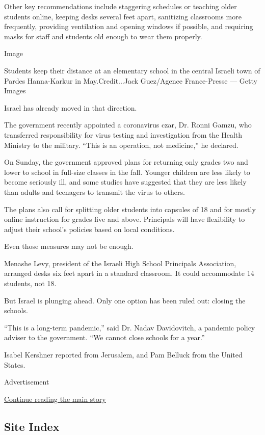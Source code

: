 Other key recommendations include staggering schedules or teaching older
students online, keeping desks several feet apart, sanitizing classrooms
more frequently, providing ventilation and opening windows if possible,
and requiring masks for staff and students old enough to wear them
properly.

Image

Students keep their distance at an elementary school in the central
Israeli town of Pardes Hanna-Karkur in May.Credit...Jack Guez/Agence
France-Presse --- Getty Images

Israel has already moved in that direction.

The government recently appointed a coronavirus czar, Dr. Ronni Gamzu,
who transferred responsibility for virus testing and investigation from
the Health Ministry to the military. ``This is an operation, not
medicine,'' he declared.

On Sunday, the government approved plans for returning only grades two
and lower to school in full-size classes in the fall. Younger children
are less likely to become seriously ill, and some studies have suggested
that they are less likely than adults and teenagers to transmit the
virus to others.

The plans also call for splitting older students into capsules of 18 and
for mostly online instruction for grades five and above. Principals will
have flexibility to adjust their school's policies based on local
conditions.

Even those measures may not be enough.

Menashe Levy, president of the Israeli High School Principals
Association, arranged desks six feet apart in a standard classroom. It
could accommodate 14 students, not 18.

But Israel is plunging ahead. Only one option has been ruled out:
closing the schools.

``This is a long-term pandemic,'' said Dr. Nadav Davidovitch, a pandemic
policy adviser to the government. ``We cannot close schools for a
year.''

Isabel Kershner reported from Jerusalem, and Pam Belluck from the United
States.

Advertisement

\protect\hyperlink{after-bottom}{Continue reading the main story}

\hypertarget{site-index}{%
\subsection{Site Index}\label{site-index}}


